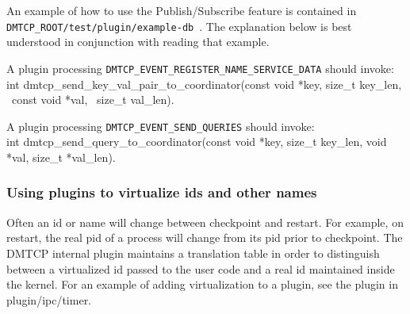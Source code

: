 \documentclass{article}
\begin{document}
An example of how to use the Publish/Subscribe feature is contained in
{\tt DMTCP\_ROOT/test/plugin/example-db}~.  The explanation below is best
understood in conjunction with reading that example.

A plugin processing {\tt DMTCP\_EVENT\_REGISTER\_NAME\_SERVICE\_DATA} should invoke: \\
int dmtcp\_send\_key\_val\_pair\_to\_coordinator(const void *key,
                                                   size\_t key\_len, \
                                                   const void *val, \
                                                   size\_t val\_len).

A plugin processing {\tt DMTCP\_EVENT\_SEND\_QUERIES} should invoke: \\
int dmtcp\_send\_query\_to\_coordinator(const void *key, size\_t key\_len,
                                            void *val, size\_t *val\_len).

\subsubsection{Using plugins to virtualize ids and other names}
\label{sec:virtualization}

Often an id or name will change between checkpoint and restart.
For example, on restart, the real pid of a process will change
from its pid prior to checkpoint.  The DMTCP internal plugin
maintains a translation table in order to distinguish
between a virtualized id passed to the user code and a real id
maintained inside the kernel.  For an example of adding virtualization
to a plugin, see the plugin in plugin/ipc/timer.
\end{document}
